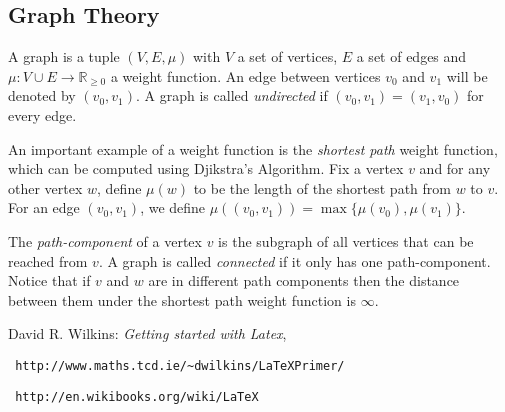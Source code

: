 \documentclass[12pt,a4paper]{amsart}
\numberwithin{equation}{section}
\theoremstyle{plain}
\theoremstyle{definition}
\begin{document}
\subsection{Graph Theory}

A graph is a tuple $(V, E, \mu)$ with $V$ a set of vertices, $E$ a set of edges and $\mu : V \cup E \to \mathbb{R}_{\geq 0}$ a weight function. An edge between vertices $v_0$ and $v_1$ will be denoted by $(v_0, v_1)$. A graph is called \textit{undirected} if $(v_0, v_1) = (v_1, v_0)$ for every edge.

An important example of a weight function is the \textit{shortest path} weight function, which can be computed using Djikstra's Algorithm. Fix a vertex $v$ and for any other vertex $w$, define $\mu(w)$ to be the length of the shortest path from $w$ to $v$. For an edge $(v_0, v_1)$, we define $\mu((v_0, v_1)) = \max\{\mu(v_0), \mu(v_1)\}$.

The \textit{path-component} of a vertex $v$ is the subgraph of all vertices that can be reached from $v$. A graph is called \textit{connected} if it only has one path-component. Notice that if $v$ and $w$ are in different path components then the distance between them under the shortest path weight function is $\infty$.



\begin{thebibliography}{99}


 David R. Wilkins: \textit{Getting started with Latex}, \begin{verbatim} http://www.maths.tcd.ie/~dwilkins/LaTeXPrimer/
\end{verbatim}

 \begin{verbatim} http://en.wikibooks.org/wiki/LaTeX \end{verbatim}



\end{thebibliography}
\end{document}
